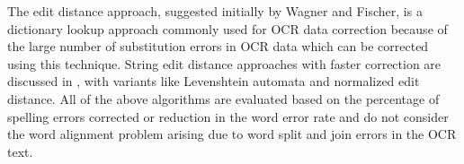 \documentclass[preprint,11pt]{elsarticle}
\begin{document}
The edit distance approach, suggested initially by Wagner and Fischer\cite{wagner1974string}, is a dictionary lookup approach commonly used for OCR data correction because of the large number of substitution errors in OCR data  \cite{kukich1992techniques}\cite{christen2006comparison} which can be corrected using this technique. String edit distance approaches with faster correction are discussed in \cite{marzal1993computation},\cite{schulz2002fast}  with variants like Levenshtein automata and normalized edit distance.
All of the above algorithms are evaluated based on the percentage of spelling errors corrected or reduction in the word error rate and do not consider the word alignment problem arising due to word split and join errors in the OCR text. 

\end{document}
